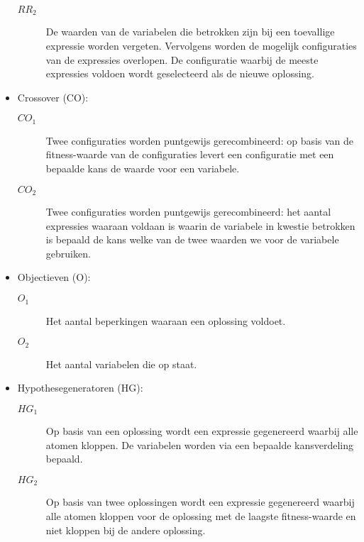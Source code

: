 \begin{itemize}
\begin{description}
 \item [$RR_2$] De waarden van de variabelen die betrokken zijn bij een toevallige expressie worden vergeten. Vervolgens worden de mogelijk configuraties van de expressies overlopen. De configuratie waarbij de meeste expressies voldoen wordt geselecteerd als de nieuwe oplossing.
\end{description}
\item Crossover (CO):
\begin{description}
 \item [$CO_1$] Twee configuraties worden puntgewijs gerecombineerd: op basis van de fitness-waarde van de configuraties levert een configuratie met een bepaalde kans de waarde voor een variabele.
 \item [$CO_2$] Twee configuraties worden puntgewijs gerecombineerd: het aantal expressies waaraan voldaan is waarin de variabele in kwestie betrokken is bepaald de kans welke van de twee waarden we voor de variabele gebruiken.
\end{description}
\item Objectieven (O):
\begin{description}
 \item [$O_1$] Het aantal beperkingen waaraan een oplossing voldoet.
 \item [$O_2$] Het aantal variabelen die op \true{} staat.
\end{description}
\item Hypothesegeneratoren (HG):
\begin{description}
 \item [$HG_1$] Op basis van een oplossing wordt een expressie gegenereerd waarbij alle atomen kloppen. De variabelen worden via een bepaalde kansverdeling bepaald.
 \item [$HG_2$] Op basis van twee oplossingen wordt een expressie gegenereerd waarbij alle atomen kloppen voor de oplossing met de laagste fitness-waarde en niet kloppen bij de andere oplossing.
\end{description}
\end{itemize}


